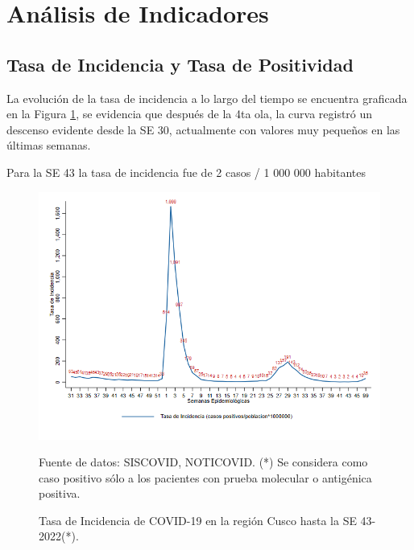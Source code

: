 \documentclass[12pt,a4paper,openany]{book}
\begin{document}
	
	
	\clearpage
	
	\section*{Análisis de Indicadores}
	\subsection*{Tasa de Incidencia y Tasa de Positividad}
	\noindent La evolución de la tasa de incidencia a lo largo del tiempo se encuentra graficada en la Figura \ref{fig:incidencia}, se
	evidencia que después de la 4ta ola, la curva registró un descenso evidente desde la SE 30, actualmente con valores muy pequeños en las últimas semanas.
	
	Para la SE 43 la tasa de incidencia fue de 2 casos / 1 000 000 habitantes
	
	
	\begin{figure}[h]
		\caption{Tasa de Incidencia de COVID-19 en la región Cusco hasta la SE 43-2022(*).  }\label{fig:incidencia}
		\begin{center}
			\includegraphics[width=0.90\linewidth]{../figuras/tasa_incidencia_2021_2022.png}
		\end{center}
		{\footnotesize {Fuente de datos: SISCOVID, NOTICOVID. (*) Se considera como caso positivo sólo a los pacientes con prueba molecular o antigénica positiva.}}
	\end{figure}
	
\end{document}

